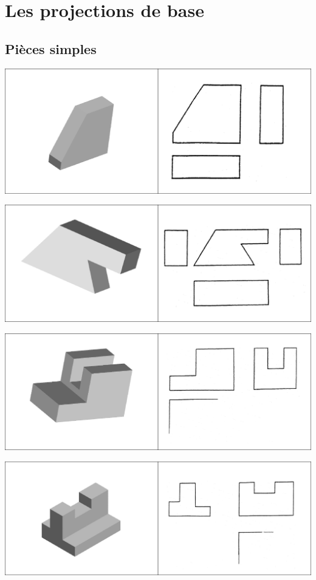 \documentclass[11pt,oneside]{article}
\begin{document}
\section{Les projections de base}
\subsection{Pièces simples}
\begin{center}
\includegraphics[width=.9\textwidth]{png/fig1}
\end{center}

\begin{center}
\includegraphics[width=.9\textwidth]{png/fig2}
\end{center}

\begin{center}
\includegraphics[width=.9\textwidth]{png/fig3}
\end{center}

\begin{center}
\includegraphics[width=.9\textwidth]{png/fig4}
\end{center}
\end{document}
